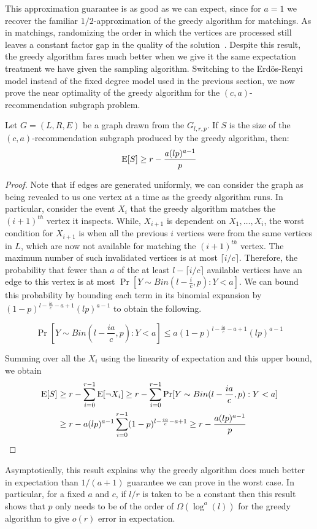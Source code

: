 This approximation guarantee is as good as we can expect, since for $a=1$ we recover the familiar
$1/2$-approximation of the greedy algorithm for matchings.
As in matchings, randomizing the order in
which the vertices are processed still leaves a constant factor gap
in the quality of the solution~\cite{KarpVaziraniVazirani1990}.
Despite this result, the greedy algorithm fares much better when we
give it the same expectation treatment we have given the sampling
algorithm. Switching to the Erd\"{o}s-Renyi model instead of the
fixed degree model used in the previous section, we now prove the
near optimality of the greedy algorithm for the $(c, a)$-recommendation
subgraph problem.

{
\renewcommand{\qedsymbol}{}
\begin{thm}
Let $G=(L,R,E)$ be a graph drawn from the $G_{l,r,p}$. If $S$ is the size of the $(c,a)$-recommendation subgraph produced by the greedy algorithm, then:
\[ \text{E}[S] \geq r - \frac{a(lp)^{a-1}}{p}\]
\end{thm}
\begin{proof}
Note that if edges are generated uniformly, we can consider the
graph as being revealed to us one vertex at a time as the greedy
algorithm runs. In particular, consider the event $X_i$ that the
greedy algorithm matches the $(i+1)^{th}$ vertex it inspects. While,
$X_{i+1}$ is dependent on $X_1,\ldots, X_i$, the worst condition for
$X_{i+1}$ is when all the previous $i$ vertices were from the same
vertices in $L$, which are now not available for matching the
$(i+1)^{th}$ vertex. The maximum number of such invalidated vertices
is at most $\lceil i/c \rceil$. Therefore, the probability that fewer
than $a$ of the at least $l-\lceil i/c \rceil $ available
vertices have an edge to this vertex is at most $\Pr[Y\sim Bin(l-\frac{i}{c},p): Y < a]$.
We can bound this probability by bounding each term in its binomial
expansion by $(1-p)^{l-\frac{ia}{c}-a+1}(lp)^{a-1}$ to obtain the following.

\[ \Pr[Y\sim Bin(l-\frac{ia}{c},p): Y < a] \leq a (1-p)^{l-\frac{ia}{c}-a+1}(lp)^{a-1}\]

Summing over all the $X_i$ using the linearity of expectation and this upper bound,
we obtain
\begin{align*}
      \text{E}[S]
&\geq r - \sum_{i=0}^{r-1} \text{E}[\lnot X_i] \geq r - \sum_{i=0}^{r-1} \Pr[Y \sim Bin(l-\frac{ia}{c},p): Y < a] \\
&\geq r - a(lp)^{a-1}\sum_{i=0}^{r-1}(1-p)^{l-\frac{ia}{c}-a+1} \geq r - \frac{a(lp)^{a-1}}{p}
\end{align*}
\end{proof}
}

Asymptotically, this result explains why the greedy
algorithm does much better in expectation than $1/(a+1)$ guarantee we
can prove in the worst case. In particular, for a fixed $a$ and $c$, if
$l/r$ is taken to be a constant then this result shows that $p$ only
needs to be of the order of $\Omega(\log^{a}(l))$ for the greedy algorithm to
give $o(r)$ error in expectation.
